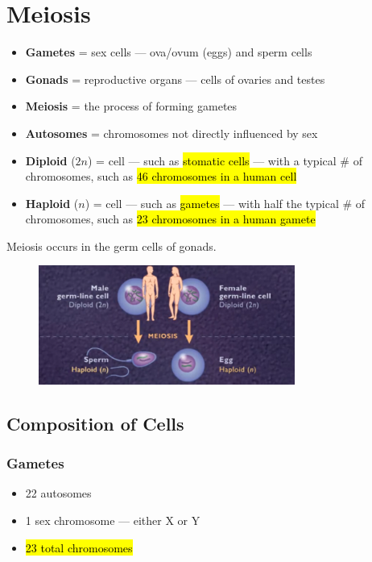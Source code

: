 \documentclass[a4paper,12pt]{article}
\begin{document}
\section{Meiosis}
\begin{itemize}
    \item{\textbf{Gametes} = sex cells --- \female\! ova/ovum (eggs) and \male\! sperm cells}
    \item{\textbf{Gonads} = reproductive organs --- cells of \female\! ovaries and \male\! testes}
    \item{\textbf{Meiosis} = the process of forming gametes}
    \item{\textbf{Autosomes} = chromosomes not directly influenced by sex}
    \item{\textbf{Diploid} ($2n$) = cell --- such as \hl{stomatic cells} --- with a typical \# of chromosomes, such as \hl{46 chromosomes in a human cell}}
    \item{\textbf{Haploid} ($n$) = cell --- such as \hl{gametes} --- with half the typical \# of chromosomes, such as \hl{23 chromosomes in a human gamete}}
\end{itemize}

Meiosis occurs in the germ cells of gonads.

\begin{figure}[H]
    \centering
    \includegraphics[width=0.75\textwidth]{loid}
\end{figure}

\subsection{Composition of Cells}

\subsubsection{Gametes}
\begin{itemize}
    \item{22 autosomes}
    \item{1 sex chromosome --- either \female X or \male Y}
    \item{\hl{23 total chromosomes}}
\end{itemize}
\end{document}
